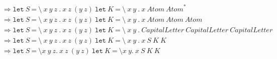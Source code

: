 \documentclass[a4paper,12pt]{article}
\begin{document}
\[\begin{aligned}
&\Longrightarrow \texttt{let}\ S\ \texttt{=}\ \texttt{\textbackslash}\ x\ y\ z\ \texttt{.}\ x\ z\ (y\ z)\ \texttt{let}\ K\ \texttt{=}\ \texttt{\textbackslash}\ x\ y\ \texttt{.}\ x\ \textit{Atom}\ \textit{Atom}^{*}\\
&\Longrightarrow \texttt{let}\ S\ \texttt{=}\ \texttt{\textbackslash}\ x\ y\ z\ \texttt{.}\ x\ z\ (y\ z)\ \texttt{let}\ K\ \texttt{=}\ \texttt{\textbackslash}\ x\ y\ \texttt{.}\ x\ \textit{Atom}\ \textit{Atom}\ \textit{Atom}\\
&\Longrightarrow \texttt{let}\ S\ \texttt{=}\ \texttt{\textbackslash}\ x\ y\ z\ \texttt{.}\ x\ z\ (y\ z)\ \texttt{let}\ K\ \texttt{=}\ \texttt{\textbackslash}\ x\ y\ \texttt{.}\ \textit{CapitalLetter}\ \textit{CapitalLetter}\ \textit{CapitalLetter}\\
&\Longrightarrow \texttt{let}\ S\ \texttt{=}\ \texttt{\textbackslash}\ x\ y\ z\ \texttt{.}\ x\ z\ (y\ z)\ \texttt{let}\ K\ \texttt{=}\ \texttt{\textbackslash}\ x\ y\ \texttt{.}\ x\ S\ K\ K\\
&\Longrightarrow \texttt{let}\ S\ \texttt{=}\ \texttt{\textbackslash} x\ y\ z.\ x\ z\ (y\ z)\ \texttt{let}\ K\ \texttt{=}\ \texttt{\textbackslash} x\ y.\ x\ S\ K\ K
\end{aligned}
\]
\end{document}
